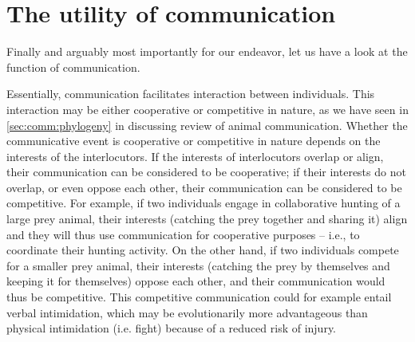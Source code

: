 \section{The utility of communication}
\label{sec:comm:function}

Finally and arguably most importantly for our endeavor, let us have a look at the function of communication.

Essentially, communication facilitates interaction between individuals.
This interaction may be either cooperative or competitive in nature, as we have seen in \cref{sec:comm:phylogeny} in discussing  review of animal communication.
Whether the communicative event is cooperative or competitive in nature depends on the interests of the interlocutors. If the interests of interlocutors overlap or align, their communication can be considered to be cooperative; if their interests do not overlap, or even oppose each other, their communication can be considered to be competitive.
For example, if two individuals engage in collaborative hunting of a large prey animal, their interests (catching the prey together and sharing it) align and they will thus use communication for cooperative purposes -- i.e., to coordinate their hunting activity. On the other hand, if two individuals compete for a smaller prey animal, their interests (catching the prey by themselves and keeping it for themselves) oppose each other, and their communication would thus be competitive. This competitive communication could for example entail verbal intimidation, which may be evolutionarily more advantageous than physical intimidation (i.e. fight) because of a reduced risk of injury.

